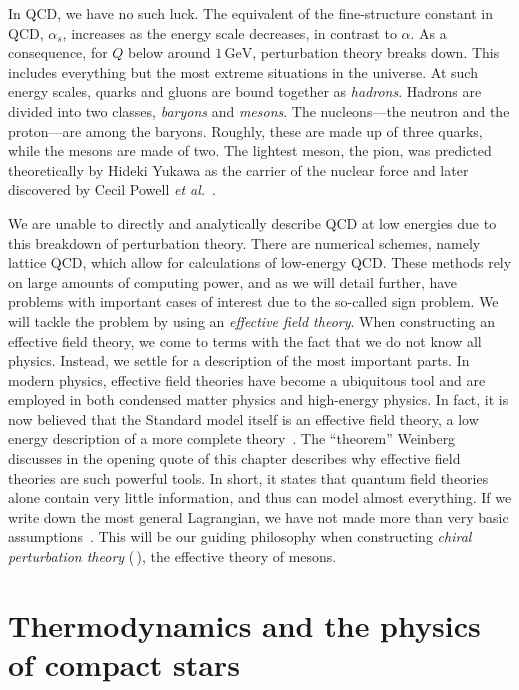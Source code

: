 In QCD, we have no such luck.
The equivalent of the fine-structure constant in QCD, $\alpha_s$, increases as the energy scale decreases, in contrast to $\alpha$.
As a consequence, for $Q$ below around $1\,\text{GeV}$, perturbation theory breaks down.
This includes everything but the most extreme situations in the universe.
At such energy scales, quarks and gluons are bound together as \emph{hadrons}.
Hadrons are divided into two classes, \emph{baryons} and \emph{mesons}.
The nucleons---the neutron and the proton---are among the baryons.
Roughly, these are made up of three quarks, while the mesons are made of two.
The lightest meson, the pion, was predicted theoretically by Hideki Yukawa as the carrier of the nuclear force and later discovered by Cecil Powell \emph{et al.}~\autocite{griffithsIntroductionElementaryParticles2008}.

We are unable to directly and analytically describe QCD at low energies due to this breakdown of perturbation theory.
There are numerical schemes, namely lattice QCD, which allow for calculations of low-energy QCD.
These methods rely on large amounts of computing power, and as we will detail further, have problems with important cases of interest due to the so-called sign problem.
We will tackle the problem by using an \emph{effective field theory}.
When constructing an effective field theory, we come to terms with the fact that we do not know all physics.
Instead, we settle for a description of the most important parts.
In modern physics, effective field theories have become a ubiquitous tool and are employed in both condensed matter physics and high-energy physics.
In fact, it is now believed that the Standard model itself is an effective field theory, a low energy description of a more complete theory~\autocite{pencoIntroductionEffectiveField2020,weinbergDevelopmentEffectiveField2021}.
The ``theorem'' Weinberg discusses in the opening quote of this chapter describes why effective field theories are such powerful tools.
In short, it states that quantum field theories alone contain very little information, and thus can model almost everything.
If we write down the most general Lagrangian, we have not made more than very basic assumptions~\autocite{weinbergPhenomenologicalLagrangians1979a}.
This will be our guiding philosophy when constructing \emph{chiral perturbation theory} (\chpt\,), the effective theory of mesons.




\section{Thermodynamics and the physics of compact stars}

